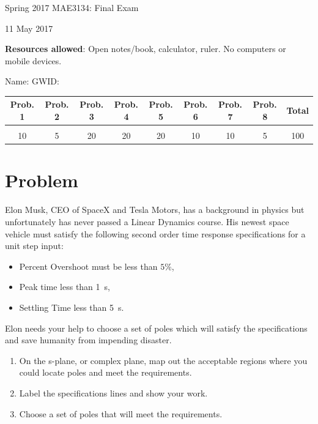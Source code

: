 \documentclass[titlepage, 11pt, reqno]{article}    %
\begin{document}
\begin{titlepage}
    \centering
    \vspace{1cm}
    {\Large Spring 2017 MAE3134: Final Exam\par }
    \vspace{3cm}
    {11 May 2017\par}
    \vspace{1cm}
    \textbf{Resources allowed}: Open notes/book, calculator, ruler. 
    No computers or mobile devices.

    \vspace{1cm}
    {Name: \underline{\hspace{5cm}} \hspace{2cm} GWID:\underline{\hspace{5cm}}\par}
    \vspace{3cm}

    \begin{tabular}{|c|c|c|c|c|c|c|c|c|}
        \hline
        Prob. 1 & Prob. 2 & Prob. 3 & Prob. 4 & Prob. 5 & Prob. 6 & Prob. 7 & Prob. 8 & Total \\
        \hline
         & & & & & & & &\\[4ex]
        \hline
        10 & 5 & 20 & 20 & 20& 10 & 10 & 5 & 100 \\[4ex]
        \hline
    \end{tabular}
    \vfill
\end{titlepage}
\section{Problem}\label{prob:sys_response_to_poles}
Elon Musk, CEO of SpaceX and Tesla Motors, has a background in physics but unfortunately has never passed a Linear Dynamics course. 
His newest space vehicle must satisfy the following second order time response specifications for a unit step input:
\begin{itemize}
    \item Percent Overshoot must be less than \(5 \%\),
    \item Peak time less than \SI{1}{\second},
    \item Settling Time less than \SI{5}{\second}.
\end{itemize}
Elon needs your help to choose a set of poles which will satisfy the specifications and save humanity from impending disaster.
\begin{enumerate}
    \item On the s-plane, or complex plane, map out the acceptable regions where you could locate poles and meet the requirements. 
    \item Label the specifications lines and show your work.
    \item Choose a set of poles that will meet the requirements.
\end{enumerate}
\end{document}
